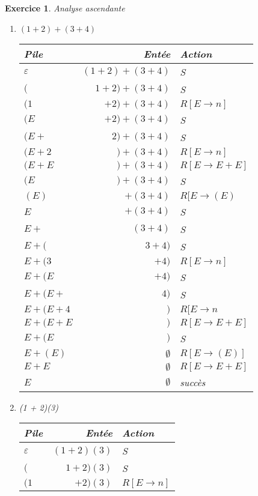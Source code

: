 \documentclass{article}
\theoremstyle{plain}
\newtheorem{exo}{Exercice}%
\begin{document}
\begin{exo} Analyse ascendante
\begin{enumerate}
  \item $(1 + 2) + (3 + 4)$\\
    \begin{tabular}{| l | r | l |}
      \hline
      Pile & Entée & Action \\
      \hline
      $\varepsilon$ & $(1 + 2) + (3 + 4)$ & S \\ 
      $($ & $1 + 2) + (3 + 4)$ & S\\
      $(1$ & $ + 2) + (3 + 4)$ & $R[E \to n]$\\
      $(E$ & $ + 2) + (3 + 4)$ & S\\
      $(E + $ & $ 2) + (3 + 4)$ & S\\
      $(E + 2$ & $) + (3 + 4)$ & $R[E \to n]$\\
      $(E + E$ & $) + (3 + 4)$ & $R[E \to E + E]$\\
      $(E$ & $) + (3 + 4)$ & S\\
      $(E)$ & $ + (3 + 4)$ & $R[E \to (E)$\\
      $E$ & $+ (3 + 4)$ & S\\
      $E + $ & $(3 + 4)$ & S\\
      $E + ($ & $3 + 4)$ & S\\
      $E + (3$ & $ + 4)$ & $R[E \to n]$\\
      $E + (E$ & $ + 4)$ & S\\
      $E + (E +$ & $ 4)$ & S\\
      $E + (E + 4$ & $)$ & $R[E \to n$\\
      $E + (E + E$ & $)$ & $R[E \to E + E]$\\
      $E + (E$ & $)$ & S\\
      $E + (E)$ & $\emptyset$ & $R[E \to (E)]$\\
      $E + E$ & $\emptyset$ & $R[E \to E + E]$\\
      $E$ & $\emptyset$ & succès\\
      \hline
    \end{tabular}
\newpage
  \item (1 + 2)(3)\\
    \begin{tabular}{| l | r | l |}
      \hline
      Pile & Entée & Action \\
      \hline
      $\varepsilon$ & $(1 + 2) (3)$ & S \\ 
      $($ & $1 + 2) (3)$ & S\\
      $(1$ & $ + 2) (3)$ & $R[E \to n]$\\

\end{tabular}
\end{enumerate}
\end{exo}
\end{document}
